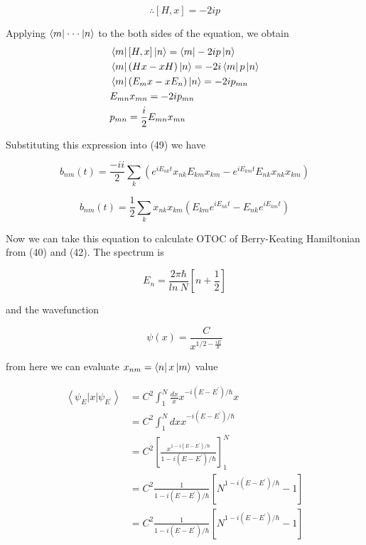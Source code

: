 \documentclass[12pt]{report}
\newcommand*{\1}{\hspace{1pt}}
\begin{document}
        \begin{equation}
            \therefore [H,x] = -2ip
        \end{equation}

        Applying $\bra{m}\cdot \cdot \cdot\ket{n}$ to the both sides of the equation, we obtain
        \begin{align*}
            &\bra{m}[H,x]\ket{n} = \bra{m}-2ip\ket{n} \\ 
            &\bra{m}(Hx-xH)\ket{n} = -2i\bra{m}p\ket{n} \\ 
            &\bra{m}(E_{m}x-xE_{n})\ket{n} = -2ip_{mn} \\ 
            &E_{mn}x_{mn} = -2ip_{mn} \\ 
            &p_{mn} = \frac{i}{2}E_{mn}x_{mn} \\  
        \end{align*}

        Substituting this expression into (49) we have 

        \begin{equation*}
            b_{nm}(t) = \frac{-i i}{2}\sum_{k} (e^{i E _{nk}t}x_{nk}E_{km}x_{km} - e^{iE_{km}t}E_{nk}x_{nk}x_{km}) 
        \end{equation*}
        
        \begin{equation}
            b_{nm}(t) = \frac{1}{2}\sum_{k} x_{nk}x_{km}(E_{km}e^{i E _{nk}t} - E_{nk}e^{iE_{km}t}) 
        \end{equation}
        
        Now we can take this equation to calculate OTOC of Berry-Keating Hamiltonian from (40) and (42). The spectrum is 

        \begin{equation}
            E_{n} = \frac{2\pi\hbar}{ln\ N}\left[n + \frac{1}{2}\right] 
        \end{equation}
        
        and the wavefunction 
        
        \begin{equation}
            \psi(x) = \frac{C}{x^{1/2 - \frac{iE}{\hbar}}}
        \end{equation}

        from here we can evaluate $x_{nm} = \bra{n}x\ket{m}$ value

        \begin{align*}
            \left\langle\psi_{E}| x |\psi_{E^{'}}\right\rangle &= C^{2} \int_{1}^{N} \frac{dx}{x} x^{-i(E-E^{'})/\hbar} x \\ 
            &= C^{2} \int_{1}^{N} dx x^{-i(E-E^{'})/\hbar} \\
            &= C^{2} \left[\frac{x^{1-i(E-E^{'})/\hbar}}{1-i(E-E^{'})/\hbar}\right]_{1}^{N} \\
            &= C^{2} \frac{1}{1-i(E-E^{'})/\hbar}\left[N^{1-i(E-E^{'})/\hbar} - 1\right] \\
            &= C^{2} \frac{1}{1-i(E-E^{'})/\hbar}\left[N^{1-i(E-E^{'})/\hbar} - 1\right] \\
        \end{align*}
\end{document}
